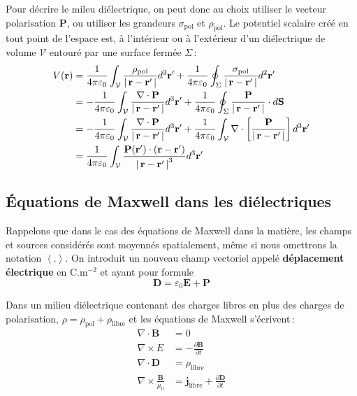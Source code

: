     Pour décrire le mileu diélectrique, on peut donc au choix utiliser le vecteur polarisation $\mathbf{P}$, ou utiliser les grandeurs $\sigma_{\text{pol}}$ et $\rho_{\text{pol}}$. Le potentiel scalaire créé en tout point de l’espace est, à l’intérieur ou à l’extérieur d’un diélectrique de volume $\mathcal{V}$ entouré par une surface fermée $\Sigma$ :
    \begin{align*}
        V(\mathbf{r}) 
        &= \frac{1}{4\pi\varepsilon_0} \int_{\mathcal{V}} \frac{\rho_{\text{pol}}}{\left\lvert \, \mathbf{r} - \mathbf{r}' \, \right\rvert}d^3 \mathbf{r}' + \frac{1}{4\pi\varepsilon_0} \oint_{\Sigma} \frac{\sigma_{\text{pol}}}{\left\lvert \, \mathbf{r} - \mathbf{r}' \, \right\rvert} d^2 \mathbf{r}' \\
        &= - \frac{1}{4\pi\varepsilon_0} \int_{\mathcal{V}} \frac{\nabla \cdot \mathbf{P}}{\left\lvert \, \mathbf{r} - \mathbf{r}' \, \right\rvert}d^3 \mathbf{r}' + \frac{1}{4\pi\varepsilon_0} \oint_{\Sigma} \frac{\mathbf{P}}{\left\lvert \, \mathbf{r} - \mathbf{r}' \, \right\rvert} \cdot d\mathbf{S} \\
        &= - \frac{1}{4\pi\varepsilon_0} \int_{\mathcal{V}} \frac{\nabla \cdot \mathbf{P}}{\left\lvert \, \mathbf{r} - \mathbf{r}' \, \right\rvert}d^3 \mathbf{r}' + \frac{1}{4\pi\varepsilon_0} \int_{\mathcal{V}} \nabla \cdot \left[\frac{\mathbf{P}}{\left\lvert \, \mathbf{r} - \mathbf{r}' \, \right\rvert} \right] d^3 \mathbf{r}' \\
        &= \frac{1}{4\pi\varepsilon_0} \int_{\mathcal{V}} \frac{\mathbf{P}(\mathbf{r}') \cdot (\mathbf{r} - \mathbf{r}')}{\left\lvert \, \mathbf{r} - \mathbf{r}' \, \right\rvert^3} d^3 \mathbf{r}'
    \end{align*}

    \subsection{Équations de Maxwell dans les diélectriques}

    Rappelons que dans le cas des équations de Maxwell dans la matière, les champs et sources considérés sont moyennés spatialement, même si nous omettrons la notation $\left<.\right>$. On introduit un nouveau champ vectoriel appelé \textbf{déplacement électrique} en $\text{C}.\text{m}^{-2}$ et ayant pour formule 
    \[ \mathbf{D} = \varepsilon_0 \mathbf{E} + \mathbf{P} \]   

    Dans un milieu diélectrique contenant des charges libres en plus des charges de polarisation, $\rho = \rho_{\text{pol}} + \rho_{\text{libre}}$ et les équations de Maxwell s’écrivent :
    \begin{align*}
        \nabla \cdot \mathbf{B} &= 0 \\
        \nabla \times E &= - \frac{\partial \mathbf{B}}{\partial t} \\
        \nabla \cdot \mathbf{D} &= \rho_{\text{libre}} \\
        \nabla \times \frac{\mathbf{B}}{\mu_0} &= \mathbf{j}_{\text{libre}} + \frac{\partial \mathbf{D}}{\partial t} \\ 
    \end{align*}

